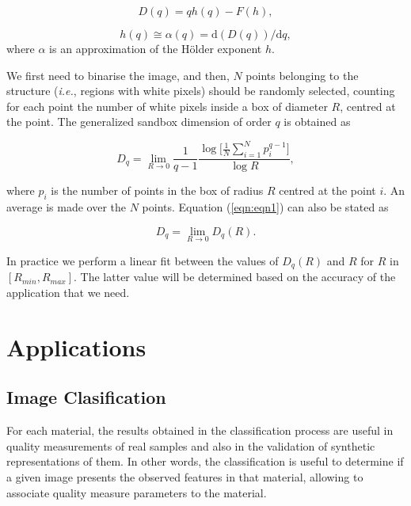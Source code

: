 \documentclass[oneside,a4paper,english,links,12pt]{article}
\begin{document}
\begin{equation}
D(q) = q h(q) - F(h),
\label{eqn:eqnLeg1}
\end{equation}

\begin{equation}
h(q) \cong \alpha(q) = \mathrm{d}(D(q))/\mathrm{d}q,
\label{eqn:eqnLeg2}
\end{equation}
where $\alpha$ is an approximation of the H\"older exponent $h$.

We first need to binarise the image, and then, $N$ points belonging to the structure ({\em i.e.}, regions with white pixels) should be randomly selected, counting for each point the number of white pixels inside a box of diameter $R$, centred at the point. The generalized sandbox dimension of order $q$ is obtained as \cite{Bert94}

\begin{equation}
D_{q} = \lim_{R\rightarrow0}{\frac{1}{q-1} \frac{\log \bigg \lbrack\frac{1}{N}\displaystyle \sum_{i=1}^{N}{p_{i}^{q-1}}\bigg \rbrack}{\log R}},
\label{eqn:eqn1}
\end{equation}

where $p_{i}$ is the number of points in the box of radius $R$ centred at the point $i$. An average is made over the $N$ points. Equation (\ref{eqn:eqn1}) can also be stated as

\begin{equation}
D_{q} = \lim_{R\rightarrow0}{D_{q}(R)}.
\end{equation}

In practice we perform a linear fit between the values of $D_{q}(R)$ and $R$ for $R$ in $[R_{min}, R_{max}]$. The latter value will be determined based on the accuracy of the application that we need.


\section{Applications}

\subsection{Image Clasification}
For each material, the results obtained in the classification process are useful in quality measurements of real samples and also in the validation of synthetic representations of them. In other words, the classification is useful to determine if a given image presents the observed features in that material, allowing to associate quality measure parameters to the material.
\end{document}
